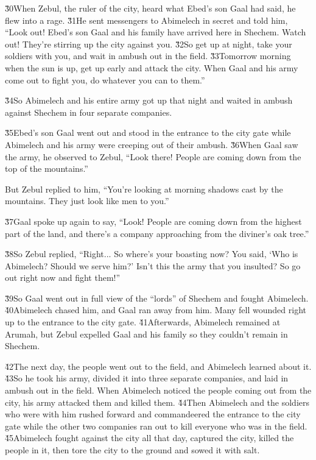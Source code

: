 \v{30}When Zebul, the ruler of the city, heard what Ebed's son Gaal had said, he flew into a rage. \v{31}He sent messengers to Abimelech in secret and told him, ``Look out! Ebed's son Gaal and his family have arrived here in Shechem. Watch out! They're stirring up the city against you. \v{32}So get up at night, take your soldiers with you, and wait in ambush out in the field. \v{33}Tomorrow morning when the sun is up, get up early and attack the city. When Gaal and his army come out to fight you, do whatever you can to them.''

\v{34}So Abimelech and his entire army got up that night and waited in ambush against Shechem in four separate companies.

\v{35}Ebed's son Gaal went out and stood in the entrance to the city gate while Abimelech and his army were creeping out of their ambush. \v{36}When Gaal saw the army, he observed to Zebul, ``Look there! People are coming down from the top of the mountains.''

But Zebul replied to him, ``You're looking at morning shadows cast by the mountains. They just look like men to you.''

\v{37}Gaal spoke up again to say, ``Look! People are coming down from the highest part of the land, and there's a company approaching from the diviner's oak tree.''

\v{38}So Zebul replied, ``Right... So where's your boasting now? You said, `Who is Abimelech? Should we serve him?' Isn't this the army that you insulted? So go out right now and fight them!''

\v{39}So Gaal went out in full view of the ``lords'' of Shechem and fought Abimelech. \v{40}Abimelech chased him, and Gaal ran away from him. Many fell wounded right up to the entrance to the city gate. \v{41}Afterwards, Abimelech remained at Arumah, but Zebul expelled Gaal and his family so they couldn't remain in Shechem.

\v{42}The next day, the people went out to the field, and Abimelech learned about it. \v{43}So he took his army, divided it into three separate companies, and laid in ambush out in the field. When Abimelech noticed the people coming out from the city, his army attacked them and killed them. \v{44}Then Abimelech and the soldiers who were with him rushed forward and commandeered the entrance to the city gate while the other two companies ran out to kill everyone who was in the field. \v{45}Abimelech fought against the city all that day, captured the city, killed the people in it, then tore the city to the ground and sowed it with salt.

